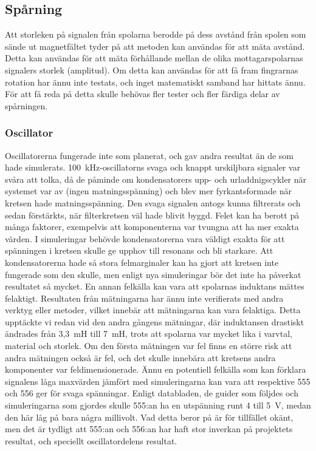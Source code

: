 \documentclass[a4paper]{article}
\makeatletter
\let\\\@raggedtwoe@savedcr%
\makeatother
\begin{document}
\begin{sloppypar}
    \subsection{Spårning}
    Att storleken på signalen från spolarna berodde på dess avstånd från spolen som sände ut magnetfältet tyder på att metoden kan användas för att mäta avstånd. Detta kan användas för att mäta förhållande mellan de olika mottagarspolarnas signalers storlek (amplitud). Om detta kan användas för att få fram fingrarnas rotation har ännu inte testats, och inget matematiskt samband har hittats ännu. För att få reda på detta skulle behövas fler tester och fler färdiga delar av spårningen.
    \subsubsection{Oscillator}
    Oscillatorerna fungerade inte som planerat, och gav andra resultat än de som hade simulerats.
    100~kHz-oscillatorns svaga och knappt urskiljbara signaler var svåra att tolka, då de påminde om kondensatorers upp- och urladdnigscykler när systemet var av (ingen matningsspänning) och blev mer fyrkantsformade när kretsen hade matningsspänning.
    Den svaga signalen antogs kunna filtrerats och sedan förstärkts, när filterkretsen väl hade blivit byggd.
    Felet kan ha berott på många faktorer, exempelvis att komponenterna var tvungna att ha mer exakta värden.
    I simuleringar behövde kondensatorerna vara väldigt exakta för att spänningen i kretsen skulle ge upphov till resonans och bli starkare.
    Att kondensatorerna hade så stora felmarginaler kan ha gjort att kretsen inte fungerade som den skulle, men enligt nya simuleringar bör det inte ha påverkat resultatet så mycket.
    \\\\
    En annan felkälla kan vara att spolarnas induktans mättes felaktigt. Resultaten från mätningarna har ännu inte verifierats med andra verktyg eller metoder, vilket innebär att mätningarna kan vara felaktiga.
    Detta upptäckte vi redan vid den andra gångens mätningar, där induktansen drastiskt ändrades från 3,3~mH till 7~mH, trots att spolarna var mycket lika i varvtal, material och storlek. Om den första mätningen var fel finns en större risk att andra mätningen också är fel, och det skulle innebära att kretsens andra komponenter var feldimensionerade.
    \\\\
    Ännu en potentiell felkälla som kan förklara signalens låga maxvärden jämfört med simuleringarna kan vara att respektive 555 och 556 ger för svaga spänningar. Enligt databladen, de guider som följdes och simuleringarna som gjordes skulle 555:an ha en utspänning runt 4 till 5~V, medan den här låg på bara några millivolt.
    Vad detta beror på är för tillfället okänt, men det är tydligt att 555:an och 556:an har haft stor inverkan på projektets resultat, och speciellt oscillatordelens resultat.

\end{sloppypar}
\end{document}

